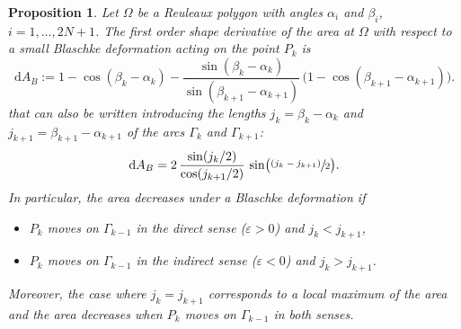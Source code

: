 \documentclass[11pt]{article}
\numberwithin{equation}{section}
\newcommand{\psfrac}[2]{\sfrac{(#1)}{#2}}
\let\epsilon\varepsilon
\theoremstyle{plain}
\newtheorem{proposition}[theorem]{Proposition}
\theoremstyle{definition}
\newcommand\de{\mathrm{d}}\let\dr\de
\let \e\epsilon
\begin{document}
\begin{proposition}\label{prop4}
Let $\Omega$ be a Reuleaux polygon with angles $\alpha_i$ and $\beta_i$, $i=1,\ldots, 2N+1$.
The first order shape derivative of the area at $\Omega$ with respect to a small Blaschke deformation acting on the point $P_k$ is
\[
\de A_B:=
1-\cos(\beta_k-\alpha_k) - \frac{\sin(\beta_k-\alpha_k)}{\sin(\beta_{k+1}-\alpha_{k+1})}\, \big(1- \cos(\beta_{k+1} - \alpha_{k+1})\big).
\]
that can also be written introducing the lengths $j_k=\beta_k-\alpha_k$ and $j_{k+1}=\beta_{k+1}
-\alpha_{k+1}$ of the arcs
$\Gamma_k$ and $\Gamma_{k+1}$:
\[
\de A_B=2\, \frac{\sin(j_k/2)}{\cos(j_{k+1}/2)}\,\sin\bigl(\psfrac{j_k-j_{k+1}}{2}\bigr).
\]
In particular, the area decreases under a Blaschke deformation if
\begin{itemize}
\item $P_k$ moves on $\Gamma_{k-1}$ in the direct sense ($\e>0$) \emph{and} $j_k<j_{k+1}$,
\item $P_k$ moves on $\Gamma_{k-1}$ in the indirect sense ($\e<0$) \emph{and} $j_k>j_{k+1}$.
\end{itemize}
Moreover, the case where $j_k=j_{k+1}$ corresponds to a local maximum of the area and the area decreases when $P_k$ moves on $\Gamma_{k-1}$ in both senses.
\end{proposition}
\end{document}
